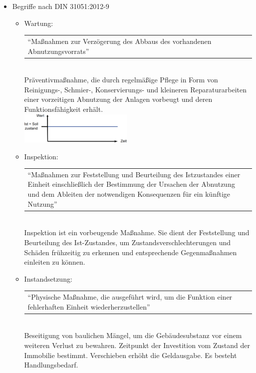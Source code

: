 \documentclass[fleqn,twoside,dvipsnames]{article}
\begin{document}
\begin{itemize}
            \item Begriffe nach DIN 31051:2012-9
                \begin{itemize}
                    \item Wartung:\\
                        \begin{tabular}{|p{13cm}} \enquote{Maßnahmen zur Verzögerung des Abbaus des vorhandenen Abnutzungsvorrats} \end{tabular}\vspace{1.5mm}\\
                        Präventivmaßnahme, die durch regelmäßige Pflege in Form von Reinigungs-, Schmier-, Konservierungs- und kleineren Reparaturarbeiten einer vorzeitigen Abnutzung der Anlagen vorbeugt und deren Funktionsfähigkeit erhält.\\
                        \includegraphics[width=0.45\textwidth]{Grafiken/Instandhaltung/Wartung.png}
                    \item Inspektion:\\
                        \begin{tabular}{|p{13cm}} \enquote{Maßnahmen zur Feststellung und Beurteilung des Istzustandes einer Einheit einschließlich der Bestimmung der Ursachen der Abnutzung und dem Ableiten der notwendigen Konsequenzen für ein künftige Nutzung} \end{tabular}\vspace{1.5mm} \\ 
                        Inspektion ist ein vorbeugende Maßnahme. Sie dient der Feststellung und Beurteilung des Ist-Zustandes, um Zustandsverschlechterungen und Schäden frühzeitig zu erkennen und entsprechende Gegenmaßnahmen einleiten zu können.
                    \item Instandsetzung:\\
                        \begin{tabular}{|p{13cm}} \enquote{Physische Maßnahme, die ausgeführt wird, um die Funktion einer fehlerhaften Einheit wiederherzustellen} \end{tabular}\vspace{1.5mm}\\
                        Beseitigung von baulichen Mängel, um die Gebäudesubstanz vor einem weiteren Verlust zu bewahren. Zeitpunkt der Investition vom Zustand der Immobilie bestimmt. Verschieben erhöht die Geldausgabe. Es besteht Handlungsbedarf.

\end{itemize}
\end{itemize}
\end{document}
